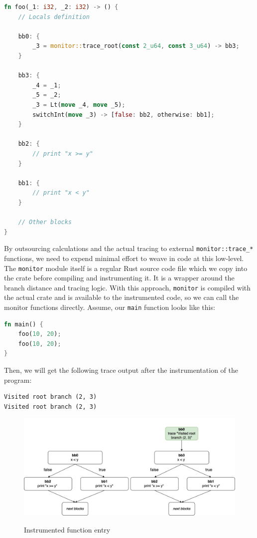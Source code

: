 \documentclass{article}
\begin{document}
\begin{lstlisting}[language=Rust, style=boxed, caption={}, label=lst:mir-instrument-root]
fn foo(_1: i32, _2: i32) -> () {
    // Locals definition

    bb0: {
        _3 = monitor::trace_root(const 2_u64, const 3_u64) -> bb3;
    }

    bb3: {
        _4 = _1;
        _5 = _2;
        _3 = Lt(move _4, move _5);
        switchInt(move _3) -> [false: bb2, otherwise: bb1];
    }

    bb2: {
        // print "x >= y"
    }

    bb1: {
        // print "x < y"
    }

    // Other blocks
}
\end{lstlisting}

By outsourcing calculations and the actual tracing to external \lstinline{monitor::trace_*} functions, we need to expend minimal effort to weave in code at this low-level. The \lstinline{monitor} module itself is a regular Rust source code file which we copy into the crate before compiling and instrumenting it. It is a wrapper around the branch distance and tracing logic. With this approach, \lstinline{monitor} is compiled with the actual crate and is available to the instrumented code, so we can call the monitor functions directly. Assume, our \lstinline{main} function looks like this:
\begin{lstlisting}[language=Rust, style=boxed, caption={}]
fn main() {
    foo(10, 20);
    foo(10, 20);
}
\end{lstlisting}

Then, we will get the following trace output after the instrumentation of the program:

\begin{lstlisting}[language={}, style=boxed, caption={}]
Visited root branch (2, 3)
Visited root branch (2, 3)
\end{lstlisting}

\begin{figure}[h]
\caption{Instrumented function entry}
\centering
\includegraphics[width=\textwidth]{comparison-instrumented-fn-entry}
\label{fig:comparison-instrumented-fn-entry}
\end{figure}
\end{document}
